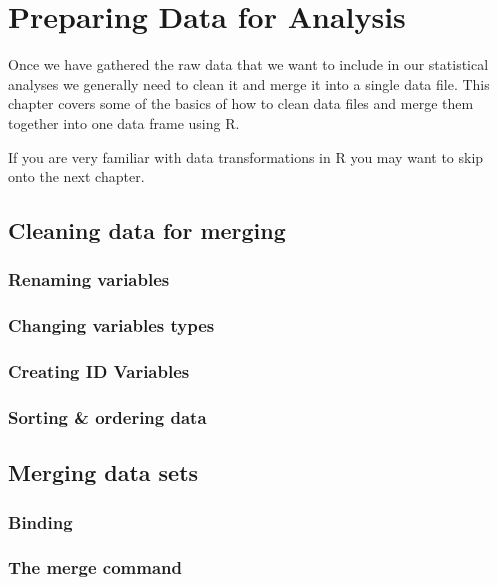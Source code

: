 



\chapter{Preparing Data for Analysis}\label{DataClean}


Once we have gathered the raw data that we want to include in our statistical analyses we generally need to clean it and merge it into a single data file. This chapter covers some of the basics of how to clean data files and merge them together into one data frame using R. 

If you are very familiar with data transformations in R you may want to skip onto the next chapter. 

\section{Cleaning data for merging}

\subsection{Renaming variables}

\subsection{Changing variables types}

\subsection{Creating ID Variables}

\subsection{Sorting \& ordering data}

\section{Merging data sets}

\subsection{Binding}

\subsection{The merge command}
